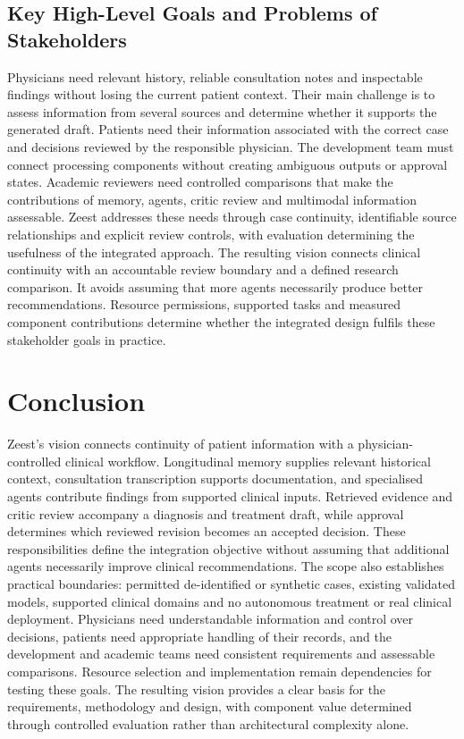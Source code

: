 \subsection{Key High-Level Goals and Problems of Stakeholders}

Physicians need relevant history, reliable consultation notes and inspectable findings without losing the current patient context. Their main challenge is to assess information from several sources and determine whether it supports the generated draft. Patients need their information associated with the correct case and decisions reviewed by the responsible physician. The development team must connect processing components without creating ambiguous outputs or approval states. Academic reviewers need controlled comparisons that make the contributions of memory, agents, critic review and multimodal information assessable. Zeest addresses these needs through case continuity, identifiable source relationships and explicit review controls, with evaluation determining the usefulness of the integrated approach. The resulting vision connects clinical continuity with an accountable review boundary and a defined research comparison. It avoids assuming that more agents necessarily produce better recommendations. Resource permissions, supported tasks and measured component contributions determine whether the integrated design fulfils these stakeholder goals in practice.

\section{Conclusion}

Zeest's vision connects continuity of patient information with a physician-controlled clinical workflow. Longitudinal memory supplies relevant historical context, consultation transcription supports documentation, and specialised agents contribute findings from supported clinical inputs. Retrieved evidence and critic review accompany a diagnosis and treatment draft, while approval determines which reviewed revision becomes an accepted decision. These responsibilities define the integration objective without assuming that additional agents necessarily improve clinical recommendations. The scope also establishes practical boundaries: permitted de-identified or synthetic cases, existing validated models, supported clinical domains and no autonomous treatment or real clinical deployment. Physicians need understandable information and control over decisions, patients need appropriate handling of their records, and the development and academic teams need consistent requirements and assessable comparisons. Resource selection and implementation remain dependencies for testing these goals. The resulting vision provides a clear basis for the requirements, methodology and design, with component value determined through controlled evaluation rather than architectural complexity alone.

\endgroup

